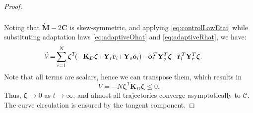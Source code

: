 \begin{proof}
\begin{align}
\begin{split}
        \end{split}
    \end{align}
    Noting that $\dot{\mathbf{M}} - 2\mathbf{C}$ is skew-symmetric, and applying \eqref{eq:controlLawEtai} while substituting adaptation laws \eqref{eq:adaptiveOhat} and \eqref{eq:adaptiveRhat}, we have:
    \begin{align}
       \hspace{-2mm} \dot{V} &{=} \sum\limits_{i=1}^{N} \boldsymbol{\zeta}^T\!\!\left({-}\mathbf{K}_D\boldsymbol{\zeta} {+} \mathbf {Y}_r \widetilde{\mathbf {r}}_i {+}\mathbf{Y}_o \widetilde{\mathbf{o}}_i\right)  {-} \widetilde{\mathbf {o}}_i^{\,T}\mathbf{Y}_o^T\boldsymbol{\zeta} {-} \widetilde{\mathbf {r}}_i^{\,T}\mathbf{Y}_r^T\boldsymbol{\zeta}. 
    \end{align}
    Note that all terms are scalars, hence we can transpose them, which results in
    \begin{equation}
        \dot{V} = -N\boldsymbol{\zeta}^T\mathbf{K}_D\boldsymbol{\zeta} \le 0.
    \end{equation}
    Thus, $\boldsymbol{\zeta}\to0$ as $t\to\infty$, and almost all trajectories converge asymptotically to $\mathcal{C}$. The curve circulation is ensured by the tangent component. 

\end{proof}
